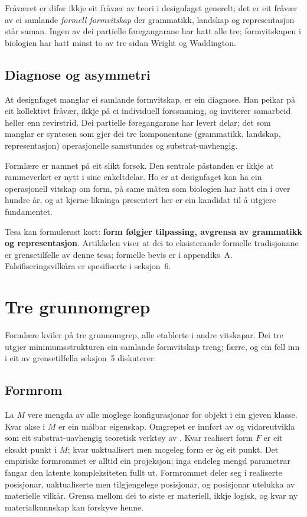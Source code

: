 \documentclass[10pt,a4paper,twocolumn]{article}
\begin{document}
Fråværet er difor ikkje eit fråvær av teori i designfaget generelt; det er eit fråvær av ei samlande \textit{formell formvitskap} der grammatikk, landskap og representasjon står saman. Ingen av dei partielle føregangarane har hatt alle tre; formvitskapen i biologien har hatt minst to av tre sidan Wright og Waddington.

\subsection{Diagnose og asymmetri}

At designfaget manglar ei samlande formvitskap, er ein diagnose. Han peikar på eit kollektivt fråvær, ikkje på ei individuell forsømming, og inviterer samarbeid heller enn revirstrid. Dei partielle føregangarane har levert delar; det som manglar er syntesen som gjer dei tre komponentane (grammatikk, landskap, representasjon) operasjonelle samstundes og substrat-uavhengig.

Formlære er namnet på eit slikt forsøk. Den sentrale påstanden er ikkje at rammeverket er nytt i sine enkeltdelar. Ho er at designfaget kan ha ein operasjonell vitskap om form, på same måten som biologien har hatt ein i over hundre år, og at kjerne-likninga presentert her er ein kandidat til å utgjere fundamentet.

Tesa kan formulerast kort: \textbf{form følgjer tilpassing, avgrensa av grammatikk og representasjon}. Artikkelen viser at dei to eksisterande formelle tradisjonane er grensetilfelle av denne tesa; formelle bevis er i appendiks~A. Falsifiseringsvilkåra er spesifiserte i seksjon~6.

\section{Tre grunnomgrep}

Formlære kviler på tre grunnomgrep, alle etablerte i andre vitskapar. Dei tre utgjer minimumsstrukturen ein samlande formvitskap treng; færre, og ein fell inn i eit av grensetilfella seksjon~5 diskuterer.

\subsection{Formrom}

La $M$ vere mengda av alle moglege konfigurasjonar for objekt i ein gjeven klasse. Kvar akse i $M$ er ein målbar eigenskap. Omgrepet er innført av \citet{raup1966} og vidareutvikla som eit substrat-uavhengig teoretisk verktøy av \citet{mitteroecker2009}. Kvar realisert form $F$ er eit eksakt punkt i $M$; kvar uaktualisert men mogeleg form er òg eit punkt. Det empiriske formrommet er alltid ein projeksjon; inga endeleg mengd parametrar fangar den latente kompleksiteten fullt ut. Formrommet deler seg i realiserte posisjonar, uaktualiserte men tilgjengelege posisjonar, og posisjonar utelukka av materielle vilkår. Grensa mellom dei to siste er materiell, ikkje logisk, og kvar ny materialkunnskap kan forskyve henne.
\end{document}
